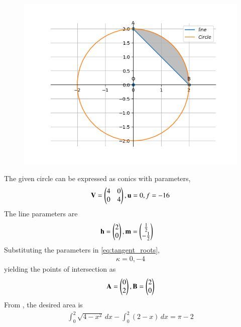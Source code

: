 	\begin{figure}[!h]
		\centering
 \includegraphics[width=\columnwidth]{chapters/12/8/2/6/figs/conic.png}
		\caption{}
		\label{fig:12/8/2/6}
  	\end{figure}
The given circle can be expressed as conics with parameters,
\begin{align}
\mathbf{V}=\begin{pmatrix}
4 & 0\\
0 & 4
\end{pmatrix},
\mathbf{u}=0,
f=-16
\end{align}
The line parameters are
\begin{align}
\mathbf{h} &= \begin{pmatrix}
2\\
0
\end{pmatrix}, 
\mathbf{m} = \begin{pmatrix}\frac{1}{2} \\ -\frac{1}{2}\end{pmatrix}
\end{align}
Substituting the parameters in \eqref{eq:tangent_roots},
\begin{align}
\kappa =0,-4
\end{align}
yielding the points of intersection as
\begin{align}
    \mathbf{A}=\begin{pmatrix}
0\\
2
    \end{pmatrix},
    \mathbf{B}=\begin{pmatrix}
2\\
0
    \end{pmatrix}
\end{align}
From 
		,
the desired area is
\begin{align}
\int_{0}^{2}\sqrt{4-x^2} \,dx 
-\int_{0}^{2} (2-x) \,dx
=\pi - 2
\end{align}
